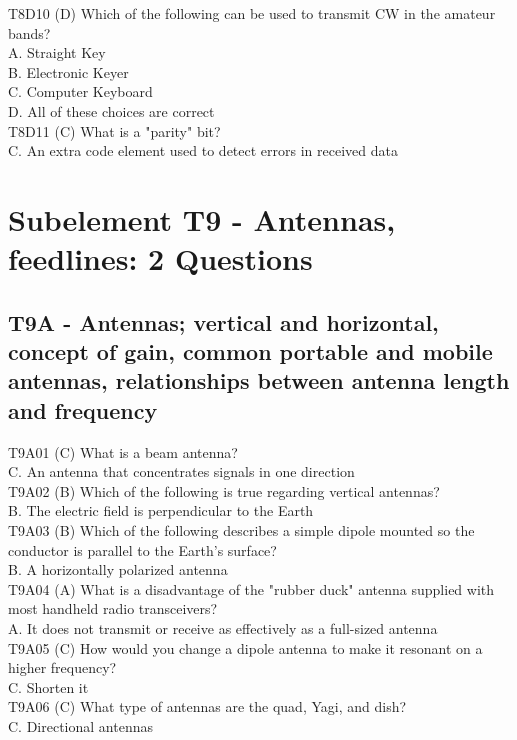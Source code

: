 \documentclass[12pt,letterpaper]{report}
\begin{document}
T8D10 (D) Which of the following can be used to transmit CW in the amateur bands?\\
A. Straight Key\\
B. Electronic Keyer\\
C. Computer Keyboard\\
D. All of these choices are correct\\

T8D11 (C) What is a "parity" bit?\\
C. An extra code element used to detect errors in received data\\

\chapter{Subelement T9 - Antennas, feedlines: 2 Questions}

\section{T9A - Antennas; vertical and horizontal, concept of gain, common portable and mobile antennas, relationships between antenna length and frequency}

T9A01 (C) What is a beam antenna?\\
C. An antenna that concentrates signals in one direction\\

T9A02 (B) Which of the following is true regarding vertical antennas?\\
B. The electric field is perpendicular to the Earth\\

T9A03 (B) Which of the following describes a simple dipole mounted so the conductor is parallel to the Earth's surface?\\
B. A horizontally polarized antenna\\

T9A04 (A) What is a disadvantage of the "rubber duck" antenna supplied with most handheld radio transceivers?\\
A. It does not transmit or receive as effectively as a full-sized antenna\\

T9A05 (C) How would you change a dipole antenna to make it resonant on a higher frequency?\\
C. Shorten it\\

T9A06 (C) What type of antennas are the quad, Yagi, and dish?\\
C. Directional antennas\\
\end{document}
